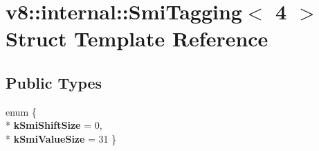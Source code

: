 \hypertarget{structv8_1_1internal_1_1_smi_tagging_3_014_01_4}{}\section{v8\+:\+:internal\+:\+:Smi\+Tagging$<$ 4 $>$ Struct Template Reference}
\label{structv8_1_1internal_1_1_smi_tagging_3_014_01_4}
\subsection*{Public Types}
\begin{DoxyCompactItemize}
\item 
enum \{ \\*
{\bfseries k\+Smi\+Shift\+Size} = 0, 
\\*
{\bfseries k\+Smi\+Value\+Size} = 31
 \}\hypertarget{structv8_1_1internal_1_1_smi_tagging_3_014_01_4_a4a08a18726d053536f2e1988bb1e1cfa}{}\label{structv8_1_1internal_1_1_smi_tagging_3_014_01_4_a4a08a18726d053536f2e1988bb1e1cfa}

\end{DoxyCompactItemize}
